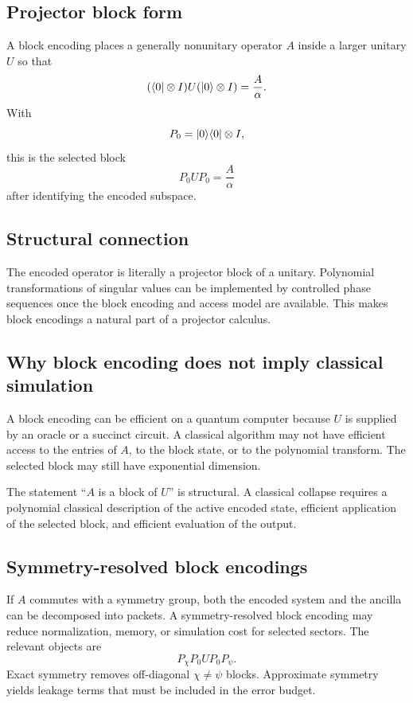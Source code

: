 \subsection{Projector block form}
A block encoding places a generally nonunitary operator $A$ inside a larger unitary $U$ so that
\[
(\langle 0\rvert\otimes I)
U
(\lvert 0\rangle\otimes I)
=
\frac{A}{\alpha}.
\]
With
\[
P_0=\lvert 0\rangle\langle 0\rvert\otimes I,
\]
this is the selected block
\[
P_0UP_0
=
\frac{A}{\alpha}
\]
after identifying the encoded subspace.

\subsection{Structural connection}
The encoded operator is literally a projector block of a unitary. Polynomial transformations of singular values can be implemented by controlled phase sequences once the block encoding and access model are available. This makes block encodings a natural part of a projector calculus.

\subsection{Why block encoding does not imply classical simulation}
A block encoding can be efficient on a quantum computer because $U$ is supplied by an oracle or a succinct circuit. A classical algorithm may not have efficient access to the entries of $A$, to the block state, or to the polynomial transform. The selected block may still have exponential dimension.

\begin{scopebox}
The statement ``$A$ is a block of $U$'' is structural. A classical collapse requires a polynomial classical description of the active encoded state, efficient application of the selected block, and efficient evaluation of the output.
\end{scopebox}

\subsection{Symmetry-resolved block encodings}
If $A$ commutes with a symmetry group, both the encoded system and the ancilla can be decomposed into packets. A symmetry-resolved block encoding may reduce normalization, memory, or simulation cost for selected sectors. The relevant objects are
\[
P_\chi P_0 U P_0P_\psi.
\]
Exact symmetry removes off-diagonal $\chi\neq\psi$ blocks. Approximate symmetry yields leakage terms that must be included in the error budget.

